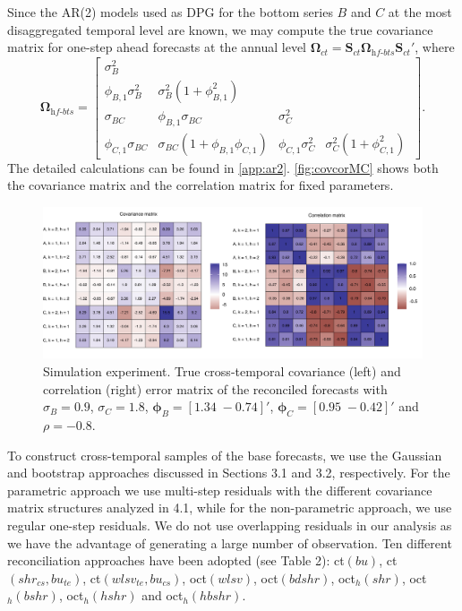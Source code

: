 \documentclass[a4paper,11pt]{article}
\newcommand{\Svet}{\bm{S}}
\newcommand{\Omegavet}{\bm{\Omega}}
\newcommand{\phivet}{\bm{\phi}}
\theoremstyle{definition}
\begin{document}
Since the AR(2) models used as DPG for the bottom series $B$ and $C$ at the most disaggregated temporal level are known, we may compute the true covariance matrix for one-step ahead forecasts at the annual level $\Omegavet_{ct} = \Svet_{ct}\Omegavet_{\textit{hf-bts}}\Svet_{ct}'$, where
$$
	\Omegavet_{\textit{hf-bts}} = \begin{bmatrix}
		\sigma^2_B            &                                                 &                      &                                        \\
		\phi_{B,1}\sigma_B^2  & \sigma_B^2\left(1+\phi_{B,1}^2\right)           &                      &                                        \\
		\sigma_{BC}           & \phi_{B,1}\sigma_{BC}                           & \sigma_C^2           &                                        \\
		\phi_{C,1}\sigma_{BC} & \sigma_{BC}\left(1+\phi_{B,1}\phi_{C,1} \right) & \phi_{C,1}\sigma_C^2 & \sigma_C^2\left(1+\phi_{C,1}^2\right)\
	\end{bmatrix}.
$$
The detailed calculations can be found in \autoref{app:ar2}.
\autoref{fig:covcorMC} shows both the covariance matrix and the correlation matrix for fixed parameters.

\begin{figure}[!t]
	\centering
	\includegraphics[width = \linewidth]{fig/AR/covcor.pdf}
	\caption{Simulation experiment. True cross-temporal covariance (left) and correlation (right) error matrix of the reconciled forecasts with $\sigma_B = 0.9$, $\sigma_C = 1.8$, $\phivet_B = [1.34\; -0.74]'$, $\phivet_C = [0.95\; -0.42]'$ and $\rho = -0.8$.}
	\label{fig:covcorMC}
\end{figure}

To construct cross-temporal samples of the base forecasts, we use the Gaussian and bootstrap approaches discussed in Sections 3.1 and 3.2, respectively. For the parametric approach we use multi-step residuals with the different covariance matrix structures analyzed in 4.1, while for the non-parametric approach, we use regular one-step residuals. We do not use overlapping residuals in our analysis as we have the advantage of generating a large number of observation. Ten different reconciliation approaches have been adopted (see Table 2): ct$(bu)$, ct$(shr_{cs}, bu_{te})$, ct$(wlsv_{te}, bu_{cs})$, oct$(wlsv)$, oct$(bdshr)$, oct$_h(shr)$, oct$_h(bshr)$, oct$_h(hshr)$ and oct$_h(hbshr)$.
\end{document}
